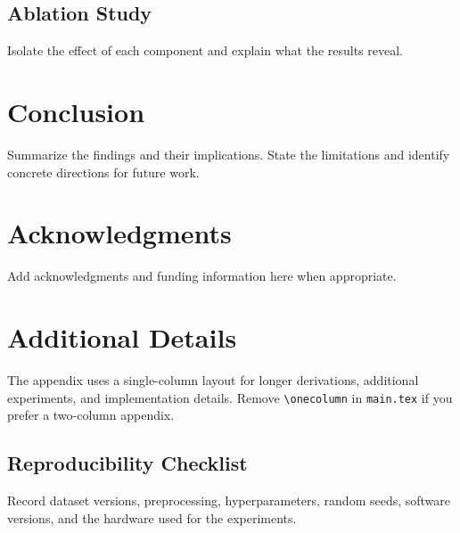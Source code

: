 \documentclass[twocolumn]{paper}
\begin{document}
\subsection{Ablation Study}
Isolate the effect of each component and explain what the results reveal.

\section{Conclusion}
Summarize the findings and their implications. State the limitations and
identify concrete directions for future work.

\section*{Acknowledgments}
Add acknowledgments and funding information here when appropriate.




\clearpage
\onecolumn
\appendix
\section{Additional Details}
\label{app:details}
The appendix uses a single-column layout for longer derivations, additional
experiments, and implementation details. Remove \verb|\onecolumn| in
\texttt{main.tex} if you prefer a two-column appendix.

\subsection{Reproducibility Checklist}
Record dataset versions, preprocessing, hyperparameters, random seeds,
software versions, and the hardware used for the experiments.
\end{document}
